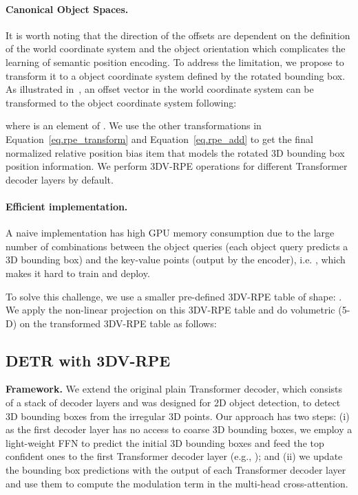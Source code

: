 \documentclass[10pt,twocolumn,letterpaper]{article}
\begin{document}
\paragraph{Canonical Object Spaces.}
It is worth noting that the direction of the offsets are dependent on the definition of the world coordinate system and the object orientation which complicates the learning of semantic position encoding. To address the limitation, we propose to transform it to a object coordinate system defined by the rotated bounding box.  As illustrated in~, an offset vector in the world coordinate system can be transformed to the object coordinate system  following:

where  is an element of . We use the other transformations in Equation~\ref{eq.rpe_transform} and Equation~\ref{eq.rpe_add} to get the final normalized relative position bias item that models the rotated 3D bounding box position information. We perform 3DV-RPE operations for different Transformer decoder layers by default.


\paragraph{Efficient implementation.} 
A naive implementation has high GPU memory consumption due to the large number of combinations between the object queries (each object query predicts a 3D bounding box) and the key-value points (output by the encoder), i.e. , which makes it hard to train and deploy.

To solve this challenge, we use a smaller pre-defined 3DV-RPE table of shape: . We apply the non-linear projection  on this 3DV-RPE table and do volumetric (5-D)  on the transformed 3DV-RPE table as follows:



\vspace{3mm}
\subsection{DETR with 3DV-RPE}
\noindent\textbf{Framework.} We extend the original plain Transformer decoder, which consists of a stack of decoder layers and was designed for 2D object detection, to detect 3D bounding boxes from the irregular 3D points. Our approach has two steps: (i) as the first decoder layer has no access to coarse 3D bounding boxes, we employ a light-weight FFN to predict the initial 3D bounding boxes and feed the top confident ones to the first Transformer decoder layer (e.g., ); and (ii) we update the bounding box predictions with the output of each Transformer decoder layer and use them to compute the modulation term in the multi-head cross-attention.
\end{document}
